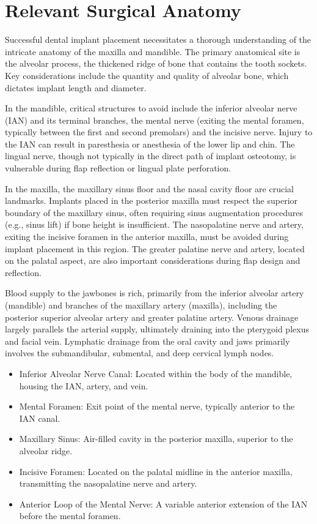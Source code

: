 \section*{Relevant Surgical Anatomy}
Successful dental implant placement necessitates a thorough understanding of the intricate anatomy of the maxilla and mandible. The primary anatomical site is the alveolar process, the thickened ridge of bone that contains the tooth sockets. Key considerations include the quantity and quality of alveolar bone, which dictates implant length and diameter. 

In the mandible, critical structures to avoid include the inferior alveolar nerve (IAN) and its terminal branches, the mental nerve (exiting the mental foramen, typically between the first and second premolars) and the incisive nerve. Injury to the IAN can result in paresthesia or anesthesia of the lower lip and chin. The lingual nerve, though not typically in the direct path of implant osteotomy, is vulnerable during flap reflection or lingual plate perforation.

In the maxilla, the maxillary sinus floor and the nasal cavity floor are crucial landmarks. Implants placed in the posterior maxilla must respect the superior boundary of the maxillary sinus, often requiring sinus augmentation procedures (e.g., sinus lift) if bone height is insufficient. The nasopalatine nerve and artery, exiting the incisive foramen in the anterior maxilla, must be avoided during implant placement in this region. The greater palatine nerve and artery, located on the palatal aspect, are also important considerations during flap design and reflection. 

Blood supply to the jawbones is rich, primarily from the inferior alveolar artery (mandible) and branches of the maxillary artery (maxilla), including the posterior superior alveolar artery and greater palatine artery. Venous drainage largely parallels the arterial supply, ultimately draining into the pterygoid plexus and facial vein. Lymphatic drainage from the oral cavity and jaws primarily involves the submandibular, submental, and deep cervical lymph nodes.

\begin{itemize}
  \item Inferior Alveolar Nerve Canal: Located within the body of the mandible, housing the IAN, artery, and vein.
  \item Mental Foramen: Exit point of the mental nerve, typically anterior to the IAN canal.
  \item Maxillary Sinus: Air-filled cavity in the posterior maxilla, superior to the alveolar ridge.
  \item Incisive Foramen: Located on the palatal midline in the anterior maxilla, transmitting the nasopalatine nerve and artery.
  \item Anterior Loop of the Mental Nerve: A variable anterior extension of the IAN before the mental foramen.
\end{itemize}

